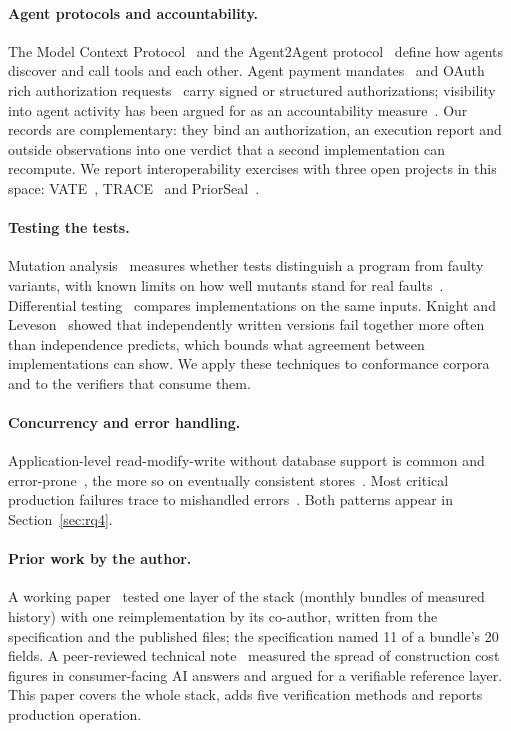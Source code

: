 \documentclass[11pt,a4paper]{article}
\begin{document}
\paragraph{Agent protocols and accountability.} The Model Context Protocol~\citep{mcp} and the Agent2Agent protocol~\citep{a2a} define how agents discover and call tools and each other. Agent payment mandates~\citep{ap2} and OAuth rich authorization requests~\citep{rfc9396} carry signed or structured authorizations; visibility into agent activity has been argued for as an accountability measure~\citep{chan2024}. Our records are complementary: they bind an authorization, an execution report and outside observations into one verdict that a second implementation can recompute. We report interoperability exercises with three open projects in this space: VATE~\citep{vate}, TRACE~\citep{trace} and PriorSeal~\citep{priorseal}.

\paragraph{Testing the tests.} Mutation analysis~\citep{demillo1978,jia2011,papadakis2019} measures whether tests distinguish a program from faulty variants, with known limits on how well mutants stand for real faults~\citep{just2014}. Differential testing~\citep{mckeeman1998,yang2011} compares implementations on the same inputs. Knight and Leveson~\citep{knight1986} showed that independently written versions fail together more often than independence predicts, which bounds what agreement between implementations can show. We apply these techniques to conformance corpora and to the verifiers that consume them.

\paragraph{Concurrency and error handling.} Application-level read-modify-write without database support is common and error-prone~\citep{bailis2015}, the more so on eventually consistent stores~\citep{vogels2009,cfkv}. Most critical production failures trace to mishandled errors~\citep{yuan2014}. Both patterns appear in Section~\ref{sec:rq4}.

\paragraph{Prior work by the author.} A working paper~\citep{ssrn7419998} tested one layer of the stack (monthly bundles of measured history) with one reimplementation by its co-author, written from the specification and the published files; the specification named 11 of a bundle's 20 fields. A peer-reviewed technical note~\citep{oga2026iic} measured the spread of construction cost figures in consumer-facing AI answers and argued for a verifiable reference layer. This paper covers the whole stack, adds five verification methods and reports production operation.
\end{document}
